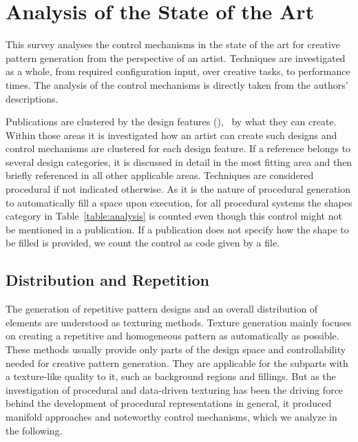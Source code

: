 

\section{Analysis of the State of the Art}
\label{sec:analysis}

This survey analyses the control mechanisms in the state of the art for creative pattern generation from the perspective of an artist. Techniques are investigated as a whole, from required configuration input, over creative tasks, to performance times. The analysis of the control mechanisms is directly taken from the authors' descriptions. 

Publications are clustered by the design features (), \ie~by what they can create. Within those areas it is investigated how an artist can create such designs and control mechanisms are clustered for each design feature. If a reference belongs to several design categories, it is discussed in detail in the most fitting area and then briefly referenced in all other applicable areas. Techniques are considered procedural if not indicated otherwise. As it is the nature of procedural generation to automatically fill a space upon execution, for all procedural systems the shapes category in Table~\ref{table:analysis} is counted even though this control might not be mentioned in a publication. 
If a publication does not specify how the shape to be filled is provided, we count the control as code given by a file.

\subsection{Distribution and Repetition}
\label{subsec:analysis_distribution_and_repetition}

The generation of repetitive pattern designs and an overall distribution of elements are understood as texturing methods. Texture generation mainly focuses on creating a repetitive and homogeneous pattern as automatically as possible. These methods usually provide only parts of the design space and controllability needed for creative pattern generation. They are applicable for the subparts with a texture-like quality to it, such as background regions and fillings. But as the investigation of procedural and data-driven texturing has been the driving force behind the development of procedural representations in general, it produced manifold approaches and noteworthy control mechanisms, which we analyze in the following.


